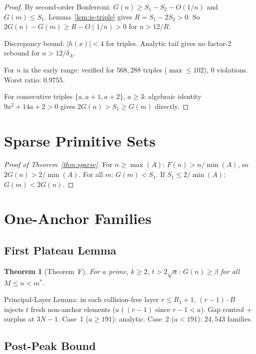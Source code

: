 \documentclass[11pt,a4paper]{article}
\newtheorem{theorem}{Theorem}[section]
\theoremstyle{definition}
\begin{document}
\begin{proof}
By second-order Bonferroni: $G(n) \geq S_1 - S_2 - O(1/n)$ and
$G(m) \leq S_1$. Lemma~\ref{lem:ie-triple} gives $R = S_1 - 2S_2 > 0$.
So $2G(n) - G(m) \geq R - O(1/n) > 0$ for $n > 12/R$.

Discrepancy bound: $|h(x)| < 4$ for triples. Analytic tail gives
no factor-$2$ rebound for $n > 12/\delta_A$.

For $n$ in the early range: verified for $568{,}288$ triples
($\max \leq 102$), $0$ violations. Worst ratio: $0.9755$.

For consecutive triples $\{a, a{+}1, a{+}2\}$, $a \geq 3$: algebraic
identity $9a^2 + 14a + 2 > 0$ gives $2G(n) > S_1 \geq G(m)$ directly.
\end{proof}

\section{Sparse Primitive Sets}

\begin{proof}[Proof of Theorem~\ref{thm:sparse}]
For $n \geq \max(A)$: $F(n) > n/\min(A)$, so $2G(n) > 2/\min(A)$.
For all $m$: $G(m) < S_1$. If $S_1 \leq 2/\min(A)$: $G(m) < 2G(n)$.
\end{proof}

\section{One-Anchor Families}

\subsection{First Plateau Lemma}

\begin{theorem}[Theorem~F]\label{thm:plateau}
For $a$ prime, $k \geq 2$, $t > 2\sqrt{a}$: $G(n) \geq \beta$ for
all $M \leq n < m^*$.
\end{theorem}

Principal-Layer Lemma: in each collision-free layer $r \leq R_1{+}1$,
$(r{-}1) \cdot B$ injects $t$ fresh non-anchor elements ($a \nmid (r{-}1)$
since $r{-}1 < a$). Gap control + surplus at $3N{-}1$.
Case~1 ($a \geq 191$): analytic. Case~2 ($a < 191$): $24{,}543$ families.

\subsection{Post-Peak Bound}
\end{document}
